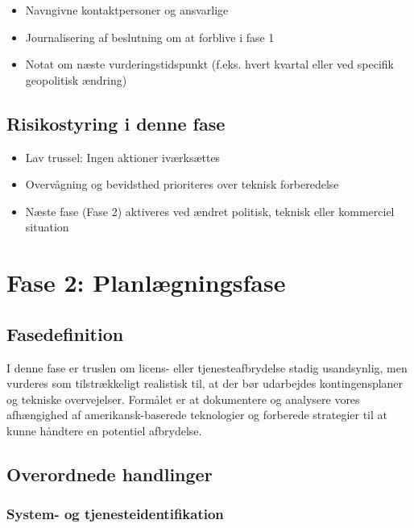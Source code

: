 \documentclass[a4paper,11pt]{book}
\begin{document}
\begin{itemize}
\tightlist
\item
  Navngivne kontaktpersoner og ansvarlige
\item
  Journalisering af beslutning om at forblive i fase 1
\item
  Notat om næste vurderingstidspunkt (f.eks. hvert kvartal eller ved
  specifik geopolitisk ændring)
\end{itemize}

\section{Risikostyring i denne fase}\label{risikostyring-i-denne-fase}

\begin{itemize}
\tightlist
\item
  Lav trussel: Ingen aktioner iværksættes
\item
  Overvågning og bevidsthed prioriteres over teknisk forberedelse
\item
  Næste fase (Fase 2) aktiveres ved ændret politisk, teknisk eller
  kommerciel situation
\end{itemize}

\newpage

\chapter{Fase 2: Planlægningsfase}\label{fase-2-planluxe6gningsfase}

\section{Fasedefinition}\label{fasedefinition}

I denne fase er truslen om licens- eller tjenesteafbrydelse stadig
usandsynlig, men vurderes som tilstrækkeligt realistisk til, at der bør
udarbejdes kontingensplaner og tekniske overvejelser. Formålet er at
dokumentere og analysere vores afhængighed af amerikansk-baserede
teknologier og forberede strategier til at kunne håndtere en potentiel
afbrydelse.

\section{Overordnede handlinger}\label{overordnede-handlinger}

\subsection{System- og
tjenesteidentifikation}\label{system--og-tjenesteidentifikation}
\end{document}
